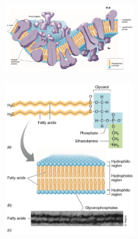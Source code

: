 \begin{multicols}{2}
\begin{figure}[H]
	\includegraphics[width=0.5\textwidth]{Pictures/9.png}
\end{figure}
\begin{figure}[H]
	\includegraphics[width=0.5\textwidth]{Pictures/10.png}
\end{figure}
\end{multicols}
